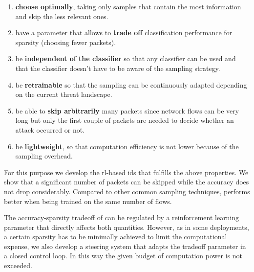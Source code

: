 \documentclass[conference]{IEEEtran}
\begin{document}
\begin{enumerate}
\item \textbf{choose optimally}, taking only samples that contain the most information and skip the less relevant ones.
\item have a parameter that allows to \textbf{trade off} classification performance for sparsity (choosing fewer packets).
\item be \textbf{independent of the classifier} so that any classifier can be used and that the classifier doesn't have to be aware of the sampling strategy.
\item be \textbf{retrainable} so that the sampling can be continuously adapted depending on the current threat landscape.
\item be able to \textbf{skip arbitrarily} many packets since network flows can be very long but only the first couple of packets are needed to decide whether an attack occurred or not. 
\item be \textbf{lightweight}, so that computation efficiency is not lower because of the sampling overhead. 
\end{enumerate}



For this purpose we develop the \gls{rl}-based \gls{ids} \textit{\ours{}} that fulfills the above properties. We show that a significant number of packets can be skipped while the accuracy does not drop
considerably. Compared to other common sampling techniques, \ours{} performs better when being trained on the same number of flows.


The accuracy-sparsity tradeoff of \ours{} can be regulated by a reinforcement learning parameter that directly affects both quantities. However, as in some deployments, a certain sparsity has to be minimally achieved to limit the computational expense, we also develop a steering system that adapts the tradeoff parameter in a closed control loop. In this way the given budget of computation power is not exceeded.
\end{document}
